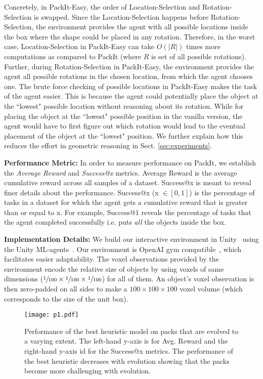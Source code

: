 \documentclass{article}
\begin{document}
Concretely, in PackIt-Easy, the order of Location-Selection and Rotation-Selection is swapped. Since the Location-Selection happens before Rotation-Selection, the environment provides the agent with all possible locations inside the box where the shape could be placed in any rotation. Therefore, in the worst case, Location-Selection in PackIt-Easy can take $O(|R|)$ times more computations as compared to PackIt (where $R$ is set of all possible rotations). Further, during Rotation-Selection in PackIt-Easy, the environment provides the agent all possible rotations in the chosen location, from which the agent chooses one. The brute force checking of possible locations in PackIt-Easy makes the task of the agent easier. This is because the agent could potentially place the object at the ``lowest" possible location without reasoning about its rotation. While for placing the object at the ``lowest" possible position in the vanilla version, the agent would have to first figure out which rotation would lead to the eventual placement of the object at the ``lowest" position. We further explain how this reduces the effort in geometric reasoning in Sect. \ref{sec:experiments}. 

\noindent\textbf{Performance Metric: }In order to measure performance on PackIt, we establish the \textit{Average Reward} and \textit{Success@x} metrics. Average Reward is the average cumulative reward across all samples of a dataset. Success@x is meant to reveal finer details about the performance. Success@x (x $\in [0, 1]$) is the percentage of tasks in a dataset for which the agent gets a cumulative reward that is greater than or equal to x. For example, Success@1 reveals the percentage of tasks that the agent completed successfully i.e. puts \textit{all} the objects inside the box.

\noindent\textbf{Implementation Details: }We build our interactive environment in Unity~\cite{goldstone2009unity} using the Unity ML-agents~\cite{juliani2018unity}. Our environment is OpenAI gym compatible~\cite{openai}, which facilitates easier adaptability. The voxel observations provided by the environment encode the relative size of objects by using voxels of same dimensions ($\sfrac{1}{100} \times \sfrac{1}{100} \times \sfrac{1}{100}$) for all of them. An object's voxel observation is then zero-padded on all sides to make a $100 \times 100 \times 100$ voxel volume (which corresponds to the size of the unit box). 
\begin{figure}[t]
  \centering 
  \texttt{[image: p1.pdf]}
  \label{fig:evol_acc}
  \caption{Performance of the best heuristic model on packs that are evolved to a varying extent. The left-hand y-axis is for Avg. Reward and the right-hand y-axis id for the Success@x metrics. The performance of the best heuristic decreases with evolution showing that the packs become more challenging with evolution.}
  \label{fig:evol}
\end{figure}
\end{document}
